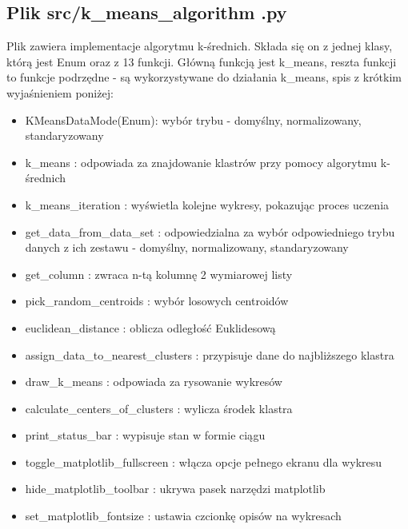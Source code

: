 \documentclass{classrep}
\begin{document}
{\subsection{Plik src/k\_means\_algorithm .py}
{
Plik zawiera implementacje algorytmu k-średnich. Składa się on z jednej klasy, którą jest Enum oraz z 13 funkcji.
Główną funkcją jest k\_means, reszta funkcji to funkcje podrzędne - są wykorzystywane do działania k\_means, spis
z krótkim wyjaśnieniem poniżej:
\begin{itemize}
\item KMeansDataMode(Enum): wybór trybu - domyślny, normalizowany, standaryzowany
\item k\_means : odpowiada za znajdowanie klastrów przy pomocy algorytmu k-średnich
\item k\_means\_iteration : wyświetla kolejne wykresy, pokazując proces uczenia
\item get\_data\_from\_data\_set : odpowiedzialna za wybór odpowiedniego trybu danych z ich zestawu - domyślny,
normalizowany, standaryzowany
\item get\_column : zwraca n-tą kolumnę 2 wymiarowej listy
\item pick\_random\_centroids : wybór losowych centroidów
\item euclidean\_distance : oblicza odległość Euklidesową
\item assign\_data\_to\_nearest\_clusters : przypisuje dane do najbliższego klastra
\item draw\_k\_means : odpowiada za rysowanie wykresów
\item calculate\_centers\_of\_clusters : wylicza środek klastra
\item print\_status\_bar : wypisuje stan w formie ciągu
\item toggle\_matplotlib\_fullscreen : włącza opcje pełnego ekranu dla wykresu
\item hide\_matplotlib\_toolbar : ukrywa pasek narzędzi matplotlib
\item set\_matplotlib\_fontsize : ustawia czcionkę opisów na wykresach
\end{itemize}
}
}
\end{document}

